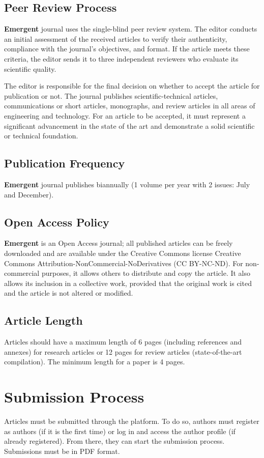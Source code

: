\documentclass[letterpaper]{EmergentUDB}
\begin{document}
\subsection{Peer Review Process}
\textbf{Emergent} journal uses the single-blind peer review system. The editor conducts an initial assessment of the received articles to verify their authenticity, compliance with the journal's objectives, and format. If the article meets these criteria, the editor sends it to three independent reviewers who evaluate its scientific quality.

The editor is responsible for the final decision on whether to accept the article for publication or not. The journal publishes scientific-technical articles, communications or short articles, monographs, and review articles in all areas of engineering and technology. For an article to be accepted, it must represent a significant advancement in the state of the art and demonstrate a solid scientific or technical foundation.

\subsection{Publication Frequency}
\textbf{Emergent} journal publishes biannually (1 volume per year with 2 issues: July and December).

\subsection{Open Access Policy}
\textbf{Emergent} is an Open Access journal; all published articles can be freely downloaded and are available under the Creative Commons license Creative Commons Attribution-NonCommercial-NoDerivatives (CC BY-NC-ND). For non-commercial purposes, it allows others to distribute and copy the article. It also allows its inclusion in a collective work, provided that the original work is cited and the article is not altered or modified.

\subsection{Article Length}
Articles should have a maximum length of 6 pages (including references and annexes) for research articles or 12 pages for review articles (state-of-the-art compilation). The minimum length for a paper is 4 pages.


\section{Submission Process}
Articles must be submitted through the platform. To do so, authors must register as authors (if it is the first time) or log in and access the author profile (if already registered). From there, they can start the submission process. Submissions must be in PDF format.
\end{document}
